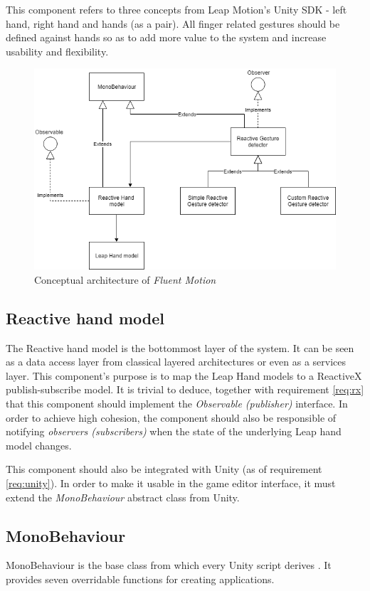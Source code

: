 \documentclass[12pt,a4paper,twoside]{report}
\begin{document}
This component refers to three concepts from Leap Motion's Unity SDK - left hand, right hand and hands (as a pair). All finger related gestures should be defined against hands so as to add more value to the system and increase usability and flexibility.

\begin{figure}[t]
  \centering
  \includegraphics[width=0.9\linewidth]{img/Thesis_conceptual_arch.png}
  \caption{Conceptual architecture of \textit{Fluent Motion}}
  \label{fig:arch}
\end{figure}

\subsection{Reactive hand model}
The Reactive hand model is the bottommost layer of the system. It can be seen as a data access layer from classical layered architectures or even as a services layer. This component's purpose is to map the Leap Hand models to a ReactiveX publish-subscribe model. It is trivial to deduce, together with requirement \ref{req:rx} that this component should implement the \textit{Observable (publisher)} interface. In order to achieve high cohesion, the component should also be responsible of notifying \textit{observers (subscribers)} when the state of the underlying Leap hand model changes.

This component should also be integrated with Unity (as of requirement \ref{req:unity}). In order to make it usable in the game editor interface, it must extend the \textit{MonoBehaviour} abstract class from Unity.

\subsection{MonoBehaviour}
MonoBehaviour is the base class from which every Unity script derives \cite{MonoBeh}. It provides seven overridable functions for creating applications.
\end{document}
